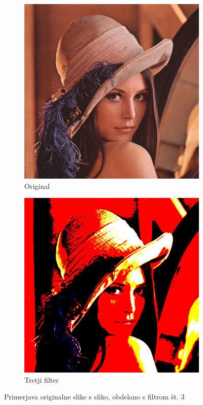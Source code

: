 \documentclass[a4paper, 12pt]{book}
\begin{document}
\begin{figure}[!ht]
    \centering
    \begin{subfigure}[b]{0.4\textwidth}
        \includegraphics[width=\textwidth]{lena}
        \caption{Original}
    \end{subfigure}
    \begin{subfigure}[b]{0.4\textwidth}
        \includegraphics[width=\textwidth]{lena_filter_3}
        \caption{Tretji filter}
    \end{subfigure}
    \caption{Primerjava originalne slike s sliko, obdelano s filtrom št. 3}
    \label{fig:lena_filter_3}
\end{figure}
\end{document}

